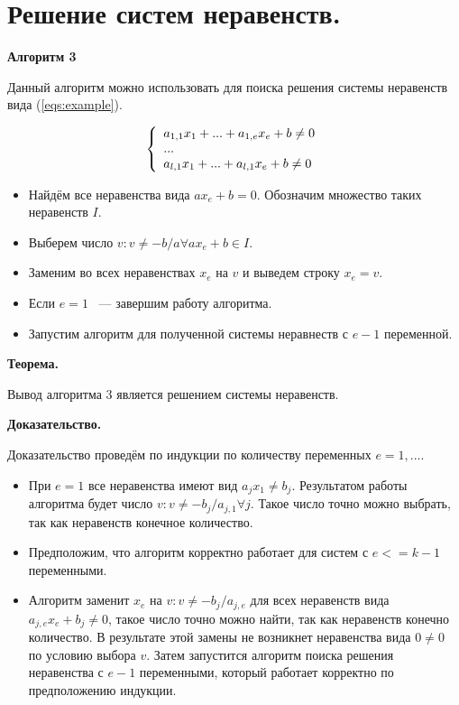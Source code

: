 \documentclass[14pt]{mmcs-article}
\begin{document}
\newpage

\section{Решение систем неравенств.}

\textbf{Алгоритм 3}

Данный алгоритм можно использовать для поиска решения системы неравенств вида (\ref{eqs:example}).

\begin{equation}
    \centering
    \left\{
        \begin{array}{ll}
            a_{1,1} x_1 + ... + a_{1,e} x_e + b \neq 0\\
            ...\\
            a_{l,1} x_1 + ... + a_{l,1} x_e + b \neq 0\\
        \end{array}
    \right.
    \label{eqs:example}
\end{equation}

\begin{itemize}
    \item Найдём все неравенства  вида $a x_e + b = 0$. Обозначим множество таких неравенств $I$.
    \item Выберем число $v: v \neq -b/a \forall a x_e + b \in I$.
    \item Заменим во всех неравенствах $x_e$ на $v$ и выведем строку $x_e = v$.
    \item Если $e = 1$ ~--- завершим работу алгоритма.
    \item Запустим алгоритм для полученной системы неравнеств с $e - 1$ переменной.
\end{itemize}

\textbf{Теорема.}

Вывод алгоритма 3 является решением системы неравенств.

\textbf{Доказательство.}

Доказательство проведём по индукции по количеству переменных $e = 1, ...$.

\begin{itemize}
\item При $e = 1$ все неравенства имеют вид $a_j x_1 \neq b_j$. Результатом работы алгоритма будет число $v: v \neq -b_{j}/a_{j, 1} \forall j$. Такое число точно можно выбрать, так как неравенств конечное количество.
\item Предположим, что алгоритм корректно работает для систем с $e <= k - 1$ переменными.
\item Алгоритм заменит $x_e$ на $v: v \neq -b_{j}/a_{j, e}$ для всех неравенств вида $a_{j, e} x_e + b_j \neq 0$, такое число точно можно найти, так как неравенств конечно количество. В результате этой замены не возникнет неравенства вида $0 \neq 0$ по условию выбора $v$. Затем запустится алгоритм поиска решения неравенства с $e - 1$ переменными, который работает корректно по предположению индукции. 
\end{itemize}
\end{document}
